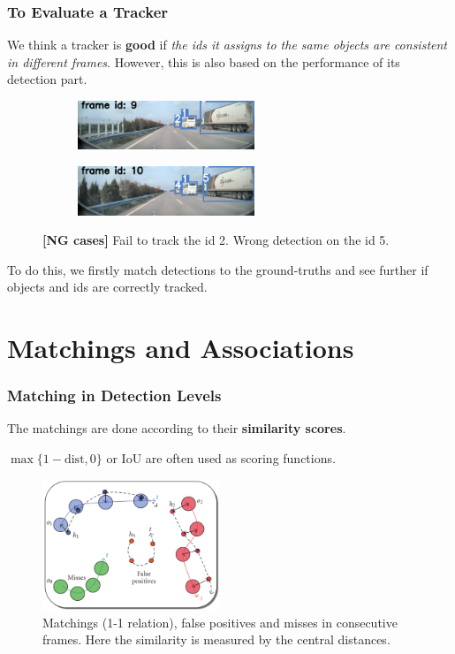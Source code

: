 \documentclass[slidetop, mathserif]{beamer}
\begin{document}
\begin{frame}
	\frametitle{To Evaluate a Tracker}

	We think a tracker is {\bf good} if
	\emph{the ids it assigns to the same objects are consistent in different frames}.
	However, this is also based on the performance of its detection part.

	\begin{figure}
		\begin{subfigure}{.48\textwidth}
		\includegraphics[width=150pt]{pics/track03.jpg}
		\end{subfigure}
		\begin{subfigure}{.48\textwidth}
		\includegraphics[width=150pt]{pics/track04.jpg}
		\end{subfigure}
		\caption{{\color{red}\bf [NG cases]} Fail to track the id 2.
			Wrong detection on the id 5.}
	\end{figure}

	To do this, we firstly match detections to the ground-truths
	and see further if objects and ids are correctly tracked.

\end{frame}

\section{Matchings and Associations}

\begin{frame}
	\frametitle{Matching in Detection Levels}
			
	The matchings are done according to their {\bf similarity scores}.
	
	$\max\{1-\text{dist}, 0\}$ or IoU
	are often used as scoring functions.
			
	\begin{figure}
		\includegraphics[width=150pt]{pics/fig2.png}
		\caption{Matchings (1-1 relation), false positives and misses in consecutive frames.
		Here the similarity is measured by the central distances.}
	\end{figure}

\end{frame}
\end{document}
